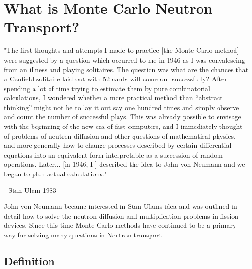 \section{What is Monte Carlo Neutron Transport?}

%	
%	

\begin{displayquote}
"The first thoughts and attempts I made to practice [the Monte Carlo method] were suggested by a question which occurred to me in 1946 as I was convalescing from an illness and playing solitaires. The question was what are the chances that a Canfield solitaire laid out with 52 cards will come out successfully? After spending a lot of time trying to estimate them by pure combinatorial calculations, I wondered whether a more practical method than “abstract thinking” might not be to lay it out say one hundred times and simply observe and count the number of successful plays. This was already possible to envisage with the beginning of the new era of fast computers, and I immediately thought of problems of neutron diffusion and other questions of mathematical physics, and more generally how to change processes described by certain differential equations into an equivalent form interpretable as a succession of random operations. Later... [in 1946, I ] described the idea to John von Neumann and we began to plan actual calculations."
\end{displayquote}
\begin{displayquote}
- Stan Ulam 1983 ~\cite{theMCM}
\end{displayquote}

John von Neumann became interested in Stan Ulams idea and was outlined in detail how to solve the neutron diffusion and multiplication problems in fission devices.
%
Since this time Monte Carlo methods have continued to be a primary way for solving many questions in Neutron transport. ~\cite{theMCM}
%

\subsection{Definition}

